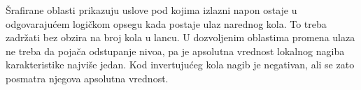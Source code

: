 Šrafirane oblasti prikazuju uslove pod kojima izlazni napon ostaje u odgovarajućem logičkom opsegu kada postaje ulaz narednog kola. To treba zadržati bez obzira na broj kola u lancu. U dozvoljenim oblastima promena ulaza ne treba da pojača odstupanje nivoa, pa je apsolutna vrednost lokalnog nagiba karakteristike najviše jedan. Kod invertujućeg kola nagib je negativan, ali se zato posmatra njegova apsolutna vrednost.
